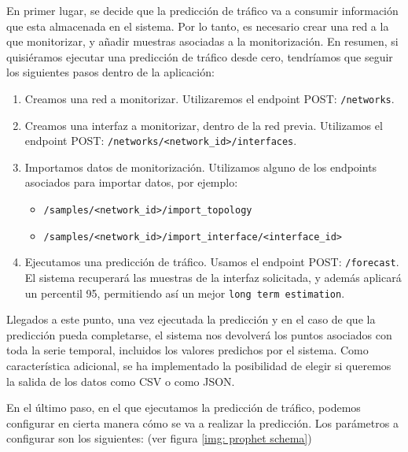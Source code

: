 \documentclass[a4paper, oneside, 12pt]{book}
\begin{document}
	\noindent En primer lugar, se decide que la predicción de tráfico va a consumir información que esta almacenada en el sistema. Por lo tanto, es necesario crear una red a la que monitorizar, y añadir muestras asociadas a la monitorización. En resumen, si quisiéramos ejecutar una predicción de tráfico desde cero, tendríamos que seguir los siguientes pasos dentro de la aplicación:
	
	\begin{enumerate}
		\item Creamos una red a monitorizar. Utilizaremos el endpoint POST: \texttt{/networks}.
		
		\item Creamos una interfaz a monitorizar, dentro de la red previa. Utilizamos el endpoint POST: \texttt{/networks/<network\_id>/interfaces}.
		
		\item Importamos datos de monitorización. Utilizamos alguno de los endpoints asociados para importar datos, por ejemplo: 
		\begin{itemize}
			\item \texttt{/samples/<network\_id>/import\_topology}
			
			\item \texttt{/samples/<network\_id>/import\_interface/<interface\_id>}
		\end{itemize}
	
		\item Ejecutamos una predicción de tráfico. Usamos el endpoint POST: \texttt{/forecast}. El sistema recuperará las muestras de la interfaz solicitada, y además aplicará un percentil 95, permitiendo así un mejor \texttt{long term estimation}.
	\end{enumerate}

	\noindent Llegados a este punto, una vez ejecutada la predicción y en el caso de que la predicción pueda completarse, el sistema nos devolverá los puntos asociados con toda la serie temporal, incluidos los valores predichos por el sistema. Como característica adicional, se ha implementado la posibilidad de elegir si queremos la salida de los datos como CSV o como JSON.

	\pagebreak

	\noindent En el último paso, en el que ejecutamos la predicción de tráfico, podemos configurar en cierta manera cómo se va a realizar la predicción. Los parámetros a configurar son los siguientes: (ver figura \ref{img: prophet schema})
	
\end{document}
